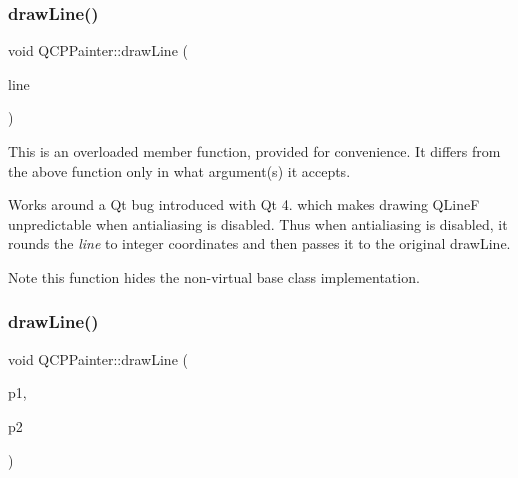 \subsubsection{\texorpdfstring{draw\+Line()}{drawLine()}\hspace{0.1cm}{\footnotesize\ttfamily [1/2]}}
{\footnotesize\ttfamily void Q\+C\+P\+Painter\+::draw\+Line (\begin{DoxyParamCaption}\item[{const Q\+LineF \&}]{line }\end{DoxyParamCaption})}

This is an overloaded member function, provided for convenience. It differs from the above function only in what argument(s) it accepts.

Works around a Qt bug introduced with Qt 4. which makes drawing Q\+LineF unpredictable when antialiasing is disabled. Thus when antialiasing is disabled, it rounds the {\itshape line} to integer coordinates and then passes it to the original draw\+Line.

\begin{DoxyNote}{Note}
this function hides the non-\/virtual base class implementation. 
\end{DoxyNote}
\mbox{\label{class_q_c_p_painter_ad1638db27929491b3f1beb74d6cbad5e}} 
\subsubsection{\texorpdfstring{draw\+Line()}{drawLine()}\hspace{0.1cm}{\footnotesize\ttfamily [2/2]}}
{\footnotesize\ttfamily void Q\+C\+P\+Painter\+::draw\+Line (\begin{DoxyParamCaption}\item[{const Q\+PointF \&}]{p1,  }\item[{const Q\+PointF \&}]{p2 }\end{DoxyParamCaption})\hspace{0.3cm}{\ttfamily [inline]}}

\mbox{\label{class_q_c_p_painter_a7e63fbcf47e35c6f2ecd11b8fef7c7d8}} 
